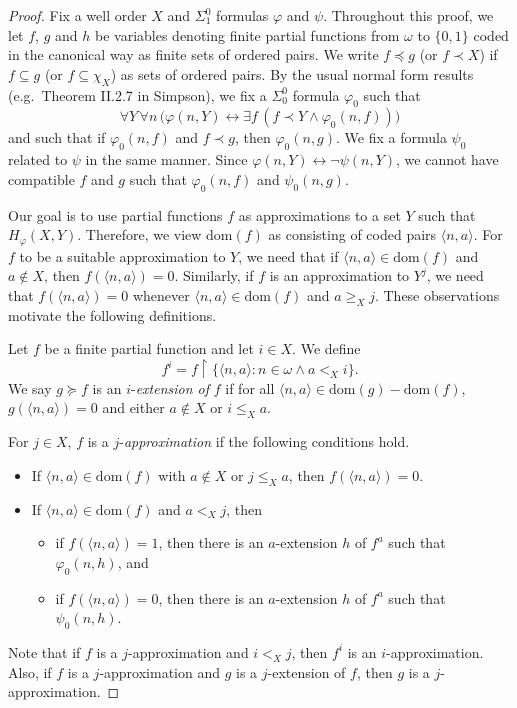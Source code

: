 \documentclass{amsart}
\theoremstyle{definition}
\theoremstyle{remark}
\begin{document}
\begin{proof}
Fix a well order $X$ and $\Sigma^0_1$ formulas $\varphi$ and $\psi$. Throughout this proof, we let $f$, $g$ and $h$ be variables 
denoting finite partial functions from $\omega$ to $\{ 0,1 \}$ coded in the canonical way as finite sets of ordered pairs. We write $f \preceq g$ 
(or $f \prec X$) if $f \subseteq g$ (or $f \subseteq \chi_X$) as sets of ordered pairs. By the usual normal form results (e.g.~Theorem II.2.7 in Simpson), 
we fix a $\Sigma^0_0$ formula $\varphi_0$ such that
\[
\forall Y \, \forall n \, \big( \varphi(n,Y) \leftrightarrow \exists f \, (f \prec Y \wedge \varphi_0(n,f)) \big)
\]
and such that if $\varphi_0(n,f)$ and $f \prec g$, then $\varphi_0(n,g)$. We fix a formula $\psi_0$ related to $\psi$ in the same manner. Since 
$\varphi(n,Y) \leftrightarrow \neg \psi(n,Y)$, we cannot have compatible $f$ and $g$ such that $\varphi_0(n,f)$ and $\psi_0(n,g)$. 

Our goal is to use partial functions $f$ as approximations to a set $Y$ such that $H_{\varphi}(X,Y)$. Therefore, we view $\text{dom}(f)$ as consisting of coded pairs 
$\langle n,a \rangle$. For $f$ to be a suitable approximation to $Y$, we need that if $\langle n,a \rangle \in \text{dom}(f)$ and $a \not \in X$, then $f(\langle n,a \rangle) = 0$. 
Similarly, if $f$ is an approximation to $Y^j$, we need that $f(\langle n,a \rangle) = 0$ whenever $\langle n,a \rangle \in \text{dom}(f)$ and $a \geq_X j$. These observations 
motivate the following definitions.

Let $f$ be a finite partial function and let $i \in X$. We define 
\[
f^i = f \upharpoonright \{ \langle n,a \rangle : n \in \omega \wedge a <_X i \}.
\]
We say $g \succeq f$ is an $i$-\textit{extension of} $f$ if for all $\langle n,a \rangle \in \text{dom}(g) - \text{dom}(f)$, $g(\langle n,a \rangle) = 0$ and either 
$a \not \in X$ or $i \leq_X a$. 

For $j \in X$, $f$ is a $j$-\textit{approximation} if the following conditions hold.
\begin{itemize}
\item If $\langle n,a \rangle \in \text{dom}(f)$ with $a \not \in X$ or $j \leq_X a$, then $f(\langle n,a \rangle) = 0$.
\item If $\langle n,a \rangle \in \text{dom}(f)$ and $a <_X j$, then 
\begin{itemize}
\item if $f(\langle n,a \rangle) = 1$, then there is an $a$-extension $h$ of $f^a$ such that $\varphi_0(n,h)$, and
\item if $f(\langle n,a \rangle) = 0$, then there is an $a$-extension $h$ of $f^a$ such that $\psi_0(n,h)$.
\end{itemize}
\end{itemize}
Note that if $f$ is a $j$-approximation and $i <_X j$, then $f^i$ is an $i$-approximation. Also, if $f$ is a $j$-approximation and $g$ is a $j$-extension of $f$, then $g$ 
is a $j$-approximation.


\end{proof}
\end{document}
